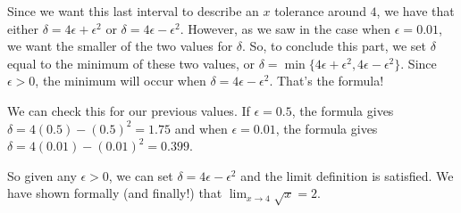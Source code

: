 \begin{example}
Since we want this last interval to describe an $x$ tolerance around $4$, we have that either $\delta = 4\epsilon + \epsilon^2$ or $\delta = 4\epsilon - \epsilon^2$. However, as we saw in the case when $\epsilon = 0.01$, we want the smaller of the two values for $\delta$.  So, to conclude this part, we set
$\delta$ equal to the minimum of these two values, or $\delta = \min\{4\epsilon + \epsilon^2, 4\epsilon - \epsilon^2\}$.  Since $\epsilon > 0$, the minimum will occur when $\delta = 4\epsilon - \epsilon^2$.  That's the formula!  

We can check this for our previous values.  If $\epsilon=0.5$, the formula gives
$\delta = 4(0.5) - (0.5)^2 = 1.75$ and when $\epsilon=0.01$, the formula gives $\delta = 4(0.01) - (0.01)^2 = 0.399$.

So given any $\epsilon >0$, we can set $\delta = 4\epsilon - \epsilon^2$ and the limit definition is satisfied.  We have shown formally (and finally!) that $\displaystyle \lim_{x\rightarrow 4} \sqrt{x} = 2 $.
\end{example}

